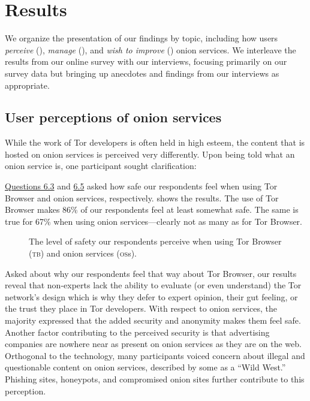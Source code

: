 \section{Results}
\label{sec:results}

We organize the presentation of our findings by topic, including how users
\emph{perceive} (), \emph{manage} (),
and \emph{wish to improve} () onion services.  We interleave the
results from our online survey with our interviews, focusing primarily on our
survey data but bringing up anecdotes and findings from our interviews as
appropriate.

\subsection{User perceptions of onion services}
\label{sec:perception}

While the work of Tor developers is often held in high esteem, the content that
is hosted on onion services is perceived very differently.  Upon being told what
an onion service is, one participant sought clarification: 

\hyperref[q6_3]{Questions 6.3} and \hyperref[q6_5]{6.5} asked how safe our
respondents feel when using Tor Browser and onion services, respectively.
 shows the results.  The use of Tor Browser makes
86\% of our respondents feel at least somewhat safe.  The same is true for 67\%
when using onion services---clearly not as many as for Tor Browser.

\begin{figure}[t]
    \centering
    
    \caption{The level of safety our respondents perceive when using Tor
    Browser (\textsc{tb}) and onion services (\textsc{os}s).}
    \label{fig:perceived-security}
\end{figure}

Asked about why our respondents feel that way about Tor Browser, our results
reveal that non-experts lack the ability to evaluate (or even understand) the
Tor network's design which is why they defer to expert opinion, their gut
feeling, or the trust they place in Tor developers.  With respect to onion
services, the majority expressed that the added security and anonymity makes
them feel safe.  Another factor contributing to the perceived security is that
advertising companies are nowhere near as present on onion services as they are
on the web.  Orthogonal to the technology, many participants voiced concern
about illegal and questionable content on onion services, described by some as a
``Wild West.'' Phishing sites, honeypots, and compromised onion sites further
contribute to this perception.

